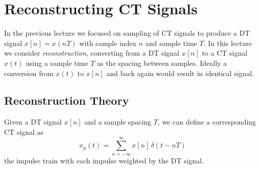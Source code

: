 \chapter{Reconstructing  CT Signals}

In the previous lecture we focused on sampling of CT signals to produce a DT signal $x[n] = x(nT)$ with sample index $n$ and sample time $T$. In this lecture we consider \emph{reconstruction}, converting from a DT signal $x[n]$ to a CT signal $x(t)$ using a sample time $T$ as the spacing between samples. Ideally a conversion from $x(t)$ to $x[n]$ and back again would result in identical signal. 

\section{Reconstruction Theory}
Given a DT signal $x[n]$ and a sample spacing $T$, we can define a corresponding CT signal as 
\[
x_p(t) = \sum\limits_{n = -\infty}^{\infty} x[n] \, \delta(t-nT)
\]
the impulse train with each impulse weighted by the DT signal.

